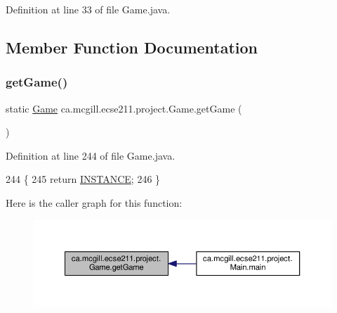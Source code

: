Definition at line 33 of file Game.\+java.



\subsection{Member Function Documentation}
\mbox{\label{enumca_1_1mcgill_1_1ecse211_1_1project_1_1_game_a52a167474d714aeaed55a877b766cf98}} 
\subsubsection{\texorpdfstring{get\+Game()}{getGame()}}
{\footnotesize\ttfamily static \hyperlink{enumca_1_1mcgill_1_1ecse211_1_1project_1_1_game}{Game} ca.\+mcgill.\+ecse211.\+project.\+Game.\+get\+Game (\begin{DoxyParamCaption}{ }\end{DoxyParamCaption})\hspace{0.3cm}{\ttfamily [static]}}



Definition at line 244 of file Game.\+java.


\begin{DoxyCode}
244                                \{
245     \textcolor{keywordflow}{return} \hyperlink{enumca_1_1mcgill_1_1ecse211_1_1project_1_1_game_a6584b6534b14ba43dc1444084a925a20}{INSTANCE};
246   \}
\end{DoxyCode}
Here is the caller graph for this function\+:
\nopagebreak
\begin{figure}[H]
\begin{center}
\leavevmode
\includegraphics[width=350pt]{enumca_1_1mcgill_1_1ecse211_1_1project_1_1_game_a52a167474d714aeaed55a877b766cf98_icgraph}
\end{center}
\end{figure}
\mbox{\label{enumca_1_1mcgill_1_1ecse211_1_1project_1_1_game_a620374b3eeb3dd7e0abd26f3ced9053b}} 
